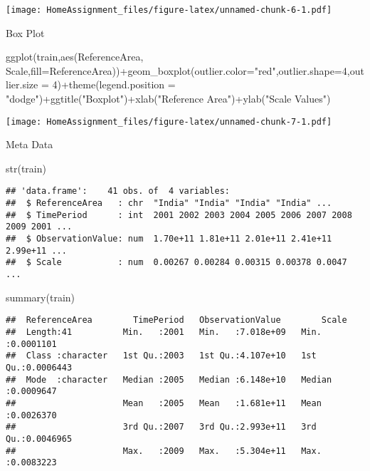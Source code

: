 \documentclass[
]{article}
\newenvironment{Shaded}{\begin{snugshade}}{\end{snugshade}}
\newcommand{\AttributeTok}[1]{\textcolor[rgb]{0.77,0.63,0.00}{#1}}
\newcommand{\DecValTok}[1]{\textcolor[rgb]{0.00,0.00,0.81}{#1}}
\newcommand{\FunctionTok}[1]{\textcolor[rgb]{0.00,0.00,0.00}{#1}}
\newcommand{\NormalTok}[1]{#1}
\newcommand{\SpecialCharTok}[1]{\textcolor[rgb]{0.00,0.00,0.00}{#1}}
\newcommand{\StringTok}[1]{\textcolor[rgb]{0.31,0.60,0.02}{#1}}
\begin{document}
\texttt{[image: HomeAssignment\_files/figure-latex/unnamed-chunk-6-1.pdf]}

Box Plot

\begin{Shaded}
\begin{Highlighting}[]
\FunctionTok{ggplot}\NormalTok{(train,}\FunctionTok{aes}\NormalTok{(ReferenceArea, Scale,}\AttributeTok{fill=}\NormalTok{ReferenceArea))}\SpecialCharTok{+}\FunctionTok{geom\_boxplot}\NormalTok{(}\AttributeTok{outlier.color=}\StringTok{"red"}\NormalTok{,}\AttributeTok{outlier.shape=}\DecValTok{4}\NormalTok{,}\AttributeTok{outlier.size =} \DecValTok{4}\NormalTok{)}\SpecialCharTok{+}\FunctionTok{theme}\NormalTok{(}\AttributeTok{legend.position =} \StringTok{"dodge"}\NormalTok{)}\SpecialCharTok{+}\FunctionTok{ggtitle}\NormalTok{(}\StringTok{"Boxplot"}\NormalTok{)}\SpecialCharTok{+}\FunctionTok{xlab}\NormalTok{(}\StringTok{"Reference Area"}\NormalTok{)}\SpecialCharTok{+}\FunctionTok{ylab}\NormalTok{(}\StringTok{"Scale Values"}\NormalTok{)}
\end{Highlighting}
\end{Shaded}

\texttt{[image: HomeAssignment\_files/figure-latex/unnamed-chunk-7-1.pdf]}

Meta Data

\begin{Shaded}
\begin{Highlighting}[]
\FunctionTok{str}\NormalTok{(train)}
\end{Highlighting}
\end{Shaded}

\begin{verbatim}
## 'data.frame':    41 obs. of  4 variables:
##  $ ReferenceArea   : chr  "India" "India" "India" "India" ...
##  $ TimePeriod      : int  2001 2002 2003 2004 2005 2006 2007 2008 2009 2001 ...
##  $ ObservationValue: num  1.70e+11 1.81e+11 2.01e+11 2.41e+11 2.99e+11 ...
##  $ Scale           : num  0.00267 0.00284 0.00315 0.00378 0.0047 ...
\end{verbatim}

\begin{Shaded}
\begin{Highlighting}[]
\FunctionTok{summary}\NormalTok{(train)}
\end{Highlighting}
\end{Shaded}

\begin{verbatim}
##  ReferenceArea        TimePeriod   ObservationValue        Scale          
##  Length:41          Min.   :2001   Min.   :7.018e+09   Min.   :0.0001101  
##  Class :character   1st Qu.:2003   1st Qu.:4.107e+10   1st Qu.:0.0006443  
##  Mode  :character   Median :2005   Median :6.148e+10   Median :0.0009647  
##                     Mean   :2005   Mean   :1.681e+11   Mean   :0.0026370  
##                     3rd Qu.:2007   3rd Qu.:2.993e+11   3rd Qu.:0.0046965  
##                     Max.   :2009   Max.   :5.304e+11   Max.   :0.0083223
\end{verbatim}
\end{document}
